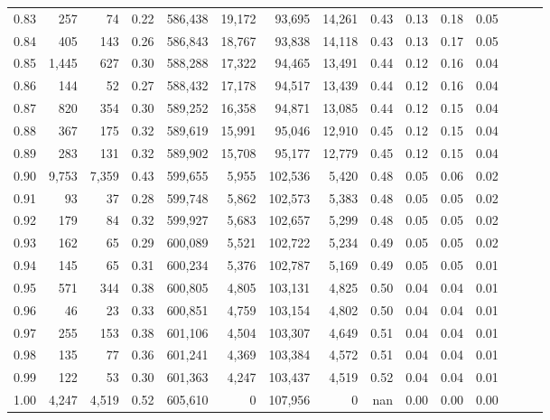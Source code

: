 \begin{tabular}{rrrrrrrrrrrrrrr}
0.83 &     257 &      74 &  0.22 &  586,438 &   19,172 &   93,695 &   14,261 &  0.43 &  0.13 &  0.18 &      0.05 \\
0.84 &     405 &     143 &  0.26 &  586,843 &   18,767 &   93,838 &   14,118 &  0.43 &  0.13 &  0.17 &      0.05 \\
0.85 &   1,445 &     627 &  0.30 &  588,288 &   17,322 &   94,465 &   13,491 &  0.44 &  0.12 &  0.16 &      0.04 \\
0.86 &     144 &      52 &  0.27 &  588,432 &   17,178 &   94,517 &   13,439 &  0.44 &  0.12 &  0.16 &      0.04 \\
0.87 &     820 &     354 &  0.30 &  589,252 &   16,358 &   94,871 &   13,085 &  0.44 &  0.12 &  0.15 &      0.04 \\
0.88 &     367 &     175 &  0.32 &  589,619 &   15,991 &   95,046 &   12,910 &  0.45 &  0.12 &  0.15 &      0.04 \\
0.89 &     283 &     131 &  0.32 &  589,902 &   15,708 &   95,177 &   12,779 &  0.45 &  0.12 &  0.15 &      0.04 \\
0.90 &   9,753 &   7,359 &  0.43 &  599,655 &    5,955 &  102,536 &    5,420 &  0.48 &  0.05 &  0.06 &      0.02 \\
0.91 &      93 &      37 &  0.28 &  599,748 &    5,862 &  102,573 &    5,383 &  0.48 &  0.05 &  0.05 &      0.02 \\
0.92 &     179 &      84 &  0.32 &  599,927 &    5,683 &  102,657 &    5,299 &  0.48 &  0.05 &  0.05 &      0.02 \\
0.93 &     162 &      65 &  0.29 &  600,089 &    5,521 &  102,722 &    5,234 &  0.49 &  0.05 &  0.05 &      0.02 \\
0.94 &     145 &      65 &  0.31 &  600,234 &    5,376 &  102,787 &    5,169 &  0.49 &  0.05 &  0.05 &      0.01 \\
0.95 &     571 &     344 &  0.38 &  600,805 &    4,805 &  103,131 &    4,825 &  0.50 &  0.04 &  0.04 &      0.01 \\
0.96 &      46 &      23 &  0.33 &  600,851 &    4,759 &  103,154 &    4,802 &  0.50 &  0.04 &  0.04 &      0.01 \\
0.97 &     255 &     153 &  0.38 &  601,106 &    4,504 &  103,307 &    4,649 &  0.51 &  0.04 &  0.04 &      0.01 \\
0.98 &     135 &      77 &  0.36 &  601,241 &    4,369 &  103,384 &    4,572 &  0.51 &  0.04 &  0.04 &      0.01 \\
0.99 &     122 &      53 &  0.30 &  601,363 &    4,247 &  103,437 &    4,519 &  0.52 &  0.04 &  0.04 &      0.01 \\
1.00 &   4,247 &   4,519 &  0.52 &  605,610 &        0 &  107,956 &        0 &   nan &  0.00 &  0.00 &      0.00 \\
\bottomrule
\end{tabular}
